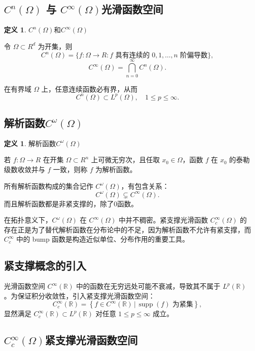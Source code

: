 \documentclass[12pt,a4paper]{article}
\newcommand{\R}{\mathbb{R}}                %
\DeclareMathOperator{\supp}{supp}          %
\def\R{R}%
\theoremstyle{plain}
\theoremstyle{definition}
\newtheorem{definition}[theorem]{定义}
\theoremstyle{remark}
\begin{document}
	

	
	\subsection{\texorpdfstring{$C^n(\Omega)$}{Cn} 与 \texorpdfstring{$C^\infty(\Omega)$}{C∞}光滑函数空间}
	
	\begin{definition}$C^n(\Omega)$和$C^\infty(\Omega)$
		
		令 $\Omega\subset\R^d$ 为开集，则
		\[
		C^n(\Omega)
		=\{f:\Omega\to\R:\text{$f$ 具有连续的 $0,1,\dots,n$ 阶偏导数}\},
		\]
		\[
		C^\infty(\Omega)
		=\bigcap_{n=0}^\infty C^n(\Omega).
		\]
	\end{definition}
	
	在有界域 $\Omega$ 上，任意连续函数必有界，从而
	\[
	C^n(\Omega)\subset L^p(\Omega),\quad 1\le p\le\infty.
	\]
	
	\subsection{解析函数$C^\omega(\Omega)$}
	
	\begin{definition}解析函数$C^\omega(\Omega)$
		
		若 $f:\Omega\to\R$ 在开集 $\Omega\subset\R^n$ 上可微无穷次，且任取 $x_0\in\Omega$，函数 $f$ 在 $x_0$ 的泰勒级数收敛并与 $f$ 一致，则称 $f$ 为解析函数。
	\end{definition}
	
	所有解析函数构成的集合记作 $C^\omega(\Omega)$，有包含关系：
	\[
	C^\omega(\Omega)\subsetneq C^\infty(\Omega).
	\]
	而且解析函数都是非紧支撑的，除了0函数。

	
	在拓扑意义下，$C^\omega(\Omega)$ 在 $C^\infty(\Omega)$ 中并不稠密。紧支撑光滑函数 $C_c^\infty(\Omega)$ 的存在正是为了替代解析函数在分布论中的不足，因为解析函数不允许有紧支撑，而 $C_c^\infty$ 中的 bump 函数是构造近似单位、分布作用的重要工具。
	
	\subsection{紧支撑概念的引入}
	光滑函数空间 $C^\infty(\mathbb{R})$ 中的函数在无穷远处可能不衰减，导致其不属于 $L^p(\mathbb{R})$。为保证积分收敛性，引入紧支撑光滑函数空间：
	\[
	C_c^\infty(\mathbb{R}) = \left\{ f \in C^\infty(\mathbb{R}) \,\big|\, \supp(f) \text{ 为紧集} \right\},
	\]
	显然满足 $C_c^\infty(\mathbb{R}) \subset L^p(\mathbb{R})$ 对任意 $1 \leq p \leq \infty$ 成立。
	\subsection{\texorpdfstring{$C_c^\infty(\Omega)$}{Cc∞}紧支撑光滑函数空间}
	
\end{document}
